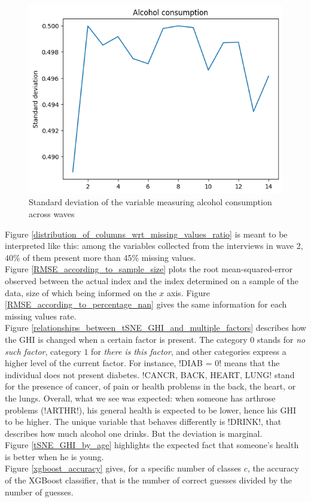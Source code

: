 \documentclass[]{article}
\begin{document}
\begin{figure}[!h]
	\centering
	\includegraphics[scale = 0.75]{std_alcohol.png}
	\caption{Standard deviation of the variable measuring alcohol consumption across waves}
	\label{std_alcohol}
\end{figure}
\noindent
Figure \ref{distribution_of_columns_wrt_missing_values_ratio} is meant to be interpreted like this: among the variables collected from the interviews in wave 2, $40$\% of them present more than $45$\% missing values.\\

\noindent
Figure \ref{RMSE_according_to_sample_size} plots the root mean-squared-error observed between the actual index and the index determined on a sample of the data, size of which being informed on the $x$ axis. Figure \ref{RMSE_according_to_percentage_nan} gives the same information for each missing values rate.\\

\noindent
Figure \ref{relationships_between_tSNE_GHI_and_multiple_factors} describes how the GHI is changed when a certain factor is present. The category $0$ stands for \textit{no such factor}, category $1$ for \textit{there is this factor}, and other categories express a higher level of the current factor. For instance, \pyth!DIAB = 0! means that the individual does not present diabetes. \pyth!CANCR, BACK, HEART, LUNG! stand for the presence of cancer, of pain or health problems in the back, the heart, or the lungs. Overall, what we see was expected: when someone has arthrose problems (\pyth!ARTHR!), his general health is expected to be lower, hence his GHI to be higher. The unique variable that behaves differently is \pyth!DRINK!, that describes how much alcohol one drinks. But the deviation is marginal.\\

\noindent
Figure \ref{tSNE_GHI_by_age} highlights the expected fact that someone's health is better when he is young.\\

\noindent
Figure \ref{xgboost_accuracy} gives, for a specific number of classes $c$, the accuracy of the XGBoost classifier, that is the number of correct guesses divided by the number of guesses.

\cleardoublepage


\end{document}
